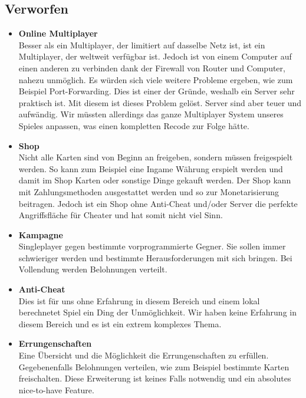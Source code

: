 \subsection*{Verworfen}
\begin{itemize}
    \item \textbf{Online Multiplayer} \\
        Besser als ein Multiplayer, der limitiert auf dasselbe Netz ist, ist ein Multiplayer, der weltweit verfügbar ist. Jedoch ist von einem Computer auf einen anderen zu
        verbinden dank der Firewall von Router und Computer, nahezu unmöglich. Es würden sich viele weitere Probleme ergeben, wie zum Beispiel Port-Forwarding. Dies ist einer der Gründe, weshalb ein Server sehr praktisch ist. Mit diesem ist dieses
        Problem gelöst. Server sind aber teuer und aufwändig. Wir müssten allerdings das ganze Multiplayer System unseres Spieles anpassen, was einen kompletten Recode zur Folge hätte.
    \item \textbf{Shop} \\
        Nicht alle Karten sind von Beginn an freigeben, sondern müssen freigespielt werden.
        So kann zum Beispiel eine Ingame Währung erspielt werden und damit im Shop Karten oder sonstige Dinge gekauft werden.
        Der Shop kann mit Zahlungsmethoden ausgestattet werden und so zur Monetarisierung beitragen.
        Jedoch ist ein Shop ohne Anti-Cheat und/oder Server die perfekte Angriffsfläche für Cheater und hat somit nicht viel Sinn.
    \item \textbf{Kampagne} \\
        Singleplayer gegen bestimmte vorprogrammierte Gegner. Sie sollen immer schwieriger werden und bestimmte Herausforderungen mit sich bringen.
        Bei Vollendung werden Belohnungen verteilt.
    \item \textbf{Anti-Cheat} \\
        Dies ist für uns ohne Erfahrung in diesem Bereich und einem lokal berechnetet Spiel ein Ding der Unmöglichkeit.
        Wir haben keine Erfahrung in diesem Bereich und es ist ein extrem komplexes Thema.
    \item \textbf{Errungenschaften} \\
        Eine Übersicht und die Möglichkeit die Errungenschaften zu erfüllen.
        Gegebenenfalls Belohnungen verteilen, wie zum Beispiel bestimmte Karten freischalten.
        Diese Erweiterung ist keines Falls notwendig und ein absolutes nice-to-have Feature.
\end{itemize}